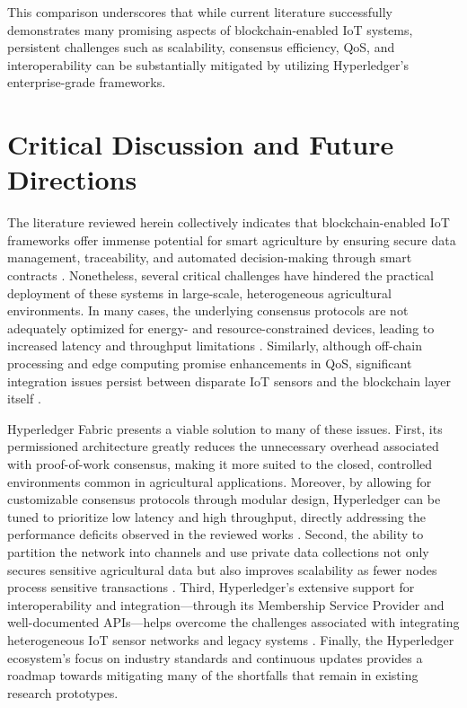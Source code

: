 \documentclass[12pt,onecolumn]{IEEEtran} %
\begin{document}
This comparison underscores that while current literature successfully demonstrates many promising aspects of blockchain-enabled IoT systems, persistent challenges such as scalability, consensus efficiency, QoS, and interoperability can be substantially mitigated by utilizing Hyperledger's enterprise-grade frameworks.

\section{Critical Discussion and Future Directions}
The literature reviewed herein collectively indicates that blockchain-enabled IoT frameworks offer immense potential for smart agriculture by ensuring secure data management, traceability, and automated decision-making through smart contracts \cite{aliyu2023blockchainbasedsmartfarm, ellahi2023blockchainbasedframeworksfor}. Nonetheless, several critical challenges have hindered the practical deployment of these systems in large-scale, heterogeneous agricultural environments. In many cases, the underlying consensus protocols are not adequately optimized for energy- and resource-constrained devices, leading to increased latency and throughput limitations \cite{ali2022blockchainenabledarchitecture, morais2023surveyonintegration}. Similarly, although off-chain processing and edge computing promise enhancements in QoS, significant integration issues persist between disparate IoT sensors and the blockchain layer itself \cite{khan2022ablockchainand, sizan2505asecuredtriad}.

Hyperledger Fabric presents a viable solution to many of these issues. First, its permissioned architecture greatly reduces the unnecessary overhead associated with proof-of-work consensus, making it more suited to the closed, controlled environments common in agricultural applications. Moreover, by allowing for customizable consensus protocols through modular design, Hyperledger can be tuned to prioritize low latency and high throughput, directly addressing the performance deficits observed in the reviewed works \cite{ellahi2023blockchainbasedframeworksfor, sajja2023towardsapplicabilityof}. Second, the ability to partition the network into channels and use private data collections not only secures sensitive agricultural data but also improves scalability as fewer nodes process sensitive transactions \cite{sakthivel2024enhancingtransparencyand, morais2023surveyonintegration}. Third, Hyperledger's extensive support for interoperability and integration—through its Membership Service Provider and well-documented APIs—helps overcome the challenges associated with integrating heterogeneous IoT sensor networks and legacy systems \cite{aliyu2023blockchainbasedsmartfarm, tang2024assessingblockchainand}. Finally, the Hyperledger ecosystem's focus on industry standards and continuous updates provides a roadmap towards mitigating many of the shortfalls that remain in existing research prototypes.
\end{document}
